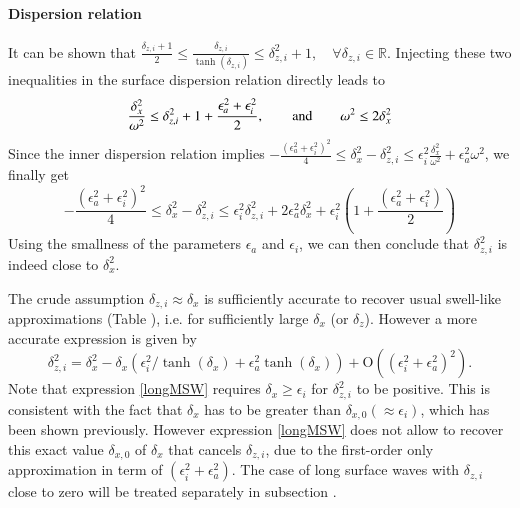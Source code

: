 \paragraph{Dispersion relation}
%
It can be shown that $\displaystyle \frac{\delta_{z,i}+1}{2}\le \frac{\delta_{z,i}}{\tanh(\delta_{z,i})}\le \delta_{z,i}^2+1, \quad \forall \delta_{z,i}\in\mathbb{R}$. Injecting these two inequalities in the surface dispersion relation directly leads to 
\[
\frac{\delta_x^2}{\omega^2}\le \delta_{z,i}^2+1+\frac{\epsilon_a^2+\epsilon_i^2}{2}, \qquad \hbox{and}\qquad \omega^2 \le 2\delta_x^2
\]
%
Since  
the inner dispersion relation  implies 
$\displaystyle
-\frac{(\epsilon_a^2+\epsilon_i^2)^2}{4}\le \delta_x^2 - \delta_{z,i}^2 
\le \epsilon_i^2\frac{\delta_x^2}
{\omega^2}+\epsilon_a^2\omega^2$, we finally get
%
\[
-\frac{(\epsilon_a^2+\epsilon_i^2)^2}{4}\le \delta_x^2 - \delta_{z,i}^2 
\le \epsilon_i^2 \delta_{z,i}^2+2\epsilon_a^2\delta_x^2
+\epsilon_i^2\left(1+\frac{(\epsilon_a^2+\epsilon_i^2)}{2}\right)
\]
%
Using the smallness of the parameters $\epsilon_a$ and $\epsilon_i$, we can then conclude that $\delta_{z,i}^2$ is indeed close to $\delta_x^2$. 
\par
%
The crude  assumption $\delta_{z,i} \approx \delta_x$ is sufficiently accurate to recover usual swell-like approximations (Table ), i.e. for sufficiently large $\delta_x$ (or $\delta_z$). However a more accurate expression is given by
\begin{equation}
\delta_{z,i}^2=\delta_x^2
-\delta_x\left(
\epsilon_i^2/\tanh(\delta_x)+\epsilon_a^2\tanh(\delta_x)
\right)
+\mathrm{O}	((\epsilon_i^2+\epsilon_a^2)^2).
\label{longMSW}
\end{equation}
Note that expression \ref{longMSW} requires $\delta_x \ge \epsilon_i$ for $\delta_{z,i}^2$ to be positive. This is consistent with the fact that $\delta_x$ has to be greater than $\delta_{x,0} (\approx \epsilon_i)$, which has been shown previously. However expression \ref{longMSW} does not allow to recover this exact value $\delta_{x,0}$ of $\delta_x$ that cancels $\delta_{z,i}$, due to the first-order only approximation in term of $(\epsilon_i^2+\epsilon_a^2)$. The case of long surface waves with $\delta_{z,i}$ close to zero will be treated separately in  subsection .
